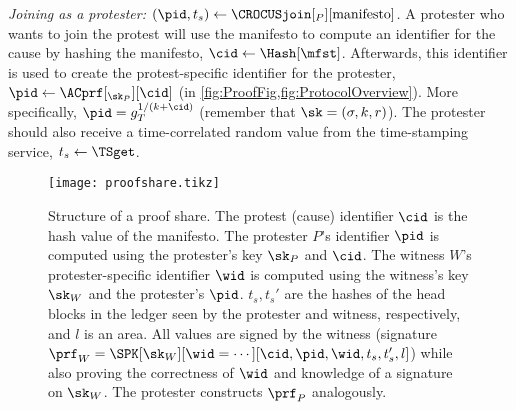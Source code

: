 \emph{Joining as a protester: \((\pid, t_s)\gets 
    \CROCUSjoin[_P][\text{manifesto}]\).}
A protester who wants to join the protest will use the manifesto to compute an identifier for the cause by hashing the manifesto, \(\cid\gets \Hash[\mfst]\).
Afterwards, this identifier is used to create the protest-specific identifier 
for the protester, \(\pid\gets \ACprf[_{\sk_P}][\cid]\) (in 
\cref{fig:ProofFig,fig:ProtocolOverview}).
More specifically, \(\pid = g_T^{1/(k+\cid)}\) (remember that \(\sk = (\sigma, k, r)\)).
The protester should also receive a time-correlated random value from the time-stamping service, \(t_s\gets \TSget\).


\begin{figure}
  \centering
  \small
  \texttt{[image: proofshare.tikz]}
  \caption{%
    Structure of a proof share.
    The protest (cause) identifier \(\cid\) is the hash value of the manifesto.
    The protester \(P\)'s identifier \(\pid\) is computed using the protester's key \(\sk_P\) and \(\cid\).
    The witness \(W\)'s protester-specific identifier \(\wid\) is computed using the
    witness's key \(\sk_W\) and the protester's \(\pid\).
    \(t_s, t_s'\) are the hashes of the head blocks in the ledger seen by the 
    protester and witness, respectively, and \(l\) is an area.
    All values are signed by the witness (signature \(\prf_W = \SPK[\sk_W][\wid 
      = \dotsb][\cid, \pid, \wid, t_s, t_s', l]\)) while also proving the 
    correctness of \(\wid\) and knowledge of a signature on \(\sk_W\).
    The protester constructs \(\prf_P\) analogously.
  }%
  \label{fig:ProofFig}
\end{figure}%

